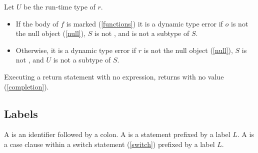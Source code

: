 \documentclass[makeidx]{article}
\begin{document}
{%

\LMHash{}%
Let $U$ be the run-time type of $r$.
\begin{itemize}
\item If the body of $f$ is marked \ASYNC{} (\ref{functions})
it is a dynamic type error if $o$ is not the null object (\ref{null}),
$S$ is not \VOID,
and  is not a subtype of $S$.
\item Otherwise,
it is a dynamic type error if $r$ is not the null object (\ref{null}),
$S$ is not \VOID{},
and $U$ is not a subtype of $S$.
\end{itemize}

\LMHash{}%
Executing a return statement with no expression, \code{\RETURN;} returns with no value (\ref{completion}).


\subsection{Labels}

\LMHash{}%
A  is an identifier followed by a colon.
A  is a statement prefixed by a label $L$.
A  is a case clause within a switch statement (\ref{switch}) prefixed by a label $L$.

}
\end{document}
